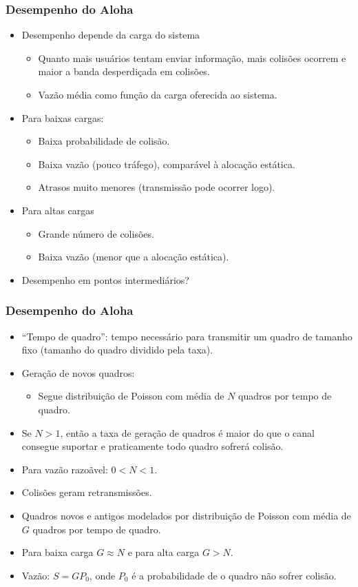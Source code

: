 \begin{frame}
	\frametitle{Desempenho do Aloha}

	\begin{itemize}
		\item Desempenho depende da carga do sistema
		\begin{itemize}
			\item Quanto mais usuários tentam enviar informação, mais colisões ocorrem e maior a banda desperdiçada em colisões.
			\item Vazão média como função da carga oferecida ao sistema.
		\end{itemize}
		\item Para baixas cargas:
		\begin{itemize}
			\item Baixa probabilidade de colisão.
			\item Baixa vazão (pouco tráfego), comparável à alocação estática.
			\item Atrasos muito menores (transmissão pode ocorrer logo).
		\end{itemize}
		\item Para altas cargas
		\begin{itemize}
			\item Grande número de colisões.
			\item Baixa vazão (menor que a alocação estática).
		\end{itemize}
		\item Desempenho em pontos intermediários?
	\end{itemize}
\end{frame}

\begin{frame}
	\frametitle{Desempenho do Aloha}

	\begin{itemize}
		\item ``Tempo de quadro'': tempo necessário para transmitir um quadro de tamanho fixo (tamanho do quadro dividido pela taxa).
		\item Geração de novos quadros:
		\begin{itemize}                            
			\item Segue distribuição de Poisson com média de $N$ quadros por tempo de quadro.
		\end{itemize}
		\item Se $N>1$,  então a taxa de geração de quadros é maior do que o canal consegue suportar e praticamente todo quadro sofrerá colisão.
		\item Para vazão razoãvel: $0 < N < 1$.
		\item Colisões geram retransmissões.
		\item Quadros novos e antigos modelados por distribuição de Poisson com média de $G$ quadros por tempo de quadro.
		\item Para baixa carga $G \approx N$ e para alta carga $G > N$.
		\item Vazão: $S = GP_0$,  onde $P_0$ é a probabilidade de o quadro não sofrer colisão.
	\end{itemize}
\end{frame}

